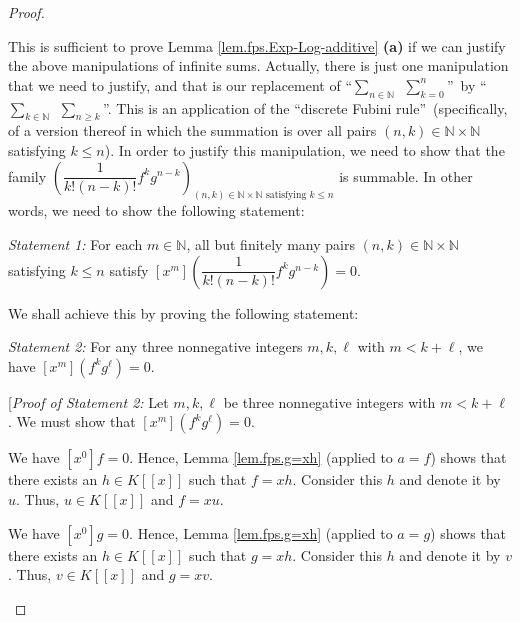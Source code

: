 \begin{proof}
\begin{fineprint}
This is sufficient to prove Lemma \ref{lem.fps.Exp-Log-additive} \textbf{(a)}
if we can justify the above manipulations of infinite sums. Actually, there is
just one manipulation that we need to justify, and that is our replacement of
\textquotedblleft$\sum_{n\in\mathbb{N}}\ \ \sum\limits_{k=0}^{n}%
$\textquotedblright\ by \textquotedblleft$\sum_{k\in\mathbb{N}}\ \ \sum
\limits_{n\geq k}$\textquotedblright. This is an application of the
\textquotedblleft discrete Fubini rule\textquotedblright\ (specifically, of a
version thereof in which the summation is over all pairs $\left(  n,k\right)
\in\mathbb{N}\times\mathbb{N}$ satisfying $k\leq n$). In order to justify this
manipulation, we need to show that the family $\left(  \dfrac{1}{k!\left(
n-k\right)  !}f^{k}g^{n-k}\right)  _{\left(  n,k\right)  \in\mathbb{N}%
\times\mathbb{N}\text{ satisfying }k\leq n}$ is summable. In other words, we
need to show the following statement:

\begin{statement}
\textit{Statement 1:} For each $m\in\mathbb{N}$, all but finitely many pairs
$\left(  n,k\right)  \in\mathbb{N}\times\mathbb{N}$ satisfying $k\leq n$
satisfy $\left[  x^{m}\right]  \left(  \dfrac{1}{k!\left(  n-k\right)  !}%
f^{k}g^{n-k}\right)  =0$.
\end{statement}

We shall achieve this by proving the following statement:

\begin{statement}
\textit{Statement 2:} For any three nonnegative integers $m,k,\ell$ with
$m<k+\ell$, we have $\left[  x^{m}\right]  \left(  f^{k}g^{\ell}\right)  =0$.
\end{statement}

[\textit{Proof of Statement 2:} Let $m,k,\ell$ be three nonnegative integers
with $m<k+\ell$. We must show that $\left[  x^{m}\right]  \left(  f^{k}%
g^{\ell}\right)  =0$.

We have $\left[  x^{0}\right]  f=0$. Hence, Lemma \ref{lem.fps.g=xh} (applied
to $a=f$) shows that there exists an $h\in K\left[  \left[  x\right]  \right]
$ such that $f=xh$. Consider this $h$ and denote it by $u$. Thus, $u\in
K\left[  \left[  x\right]  \right]  $ and $f=xu$.

We have $\left[  x^{0}\right]  g=0$. Hence, Lemma \ref{lem.fps.g=xh} (applied
to $a=g$) shows that there exists an $h\in K\left[  \left[  x\right]  \right]
$ such that $g=xh$. Consider this $h$ and denote it by $v$. Thus, $v\in
K\left[  \left[  x\right]  \right]  $ and $g=xv$.


\end{fineprint}
\end{proof}
